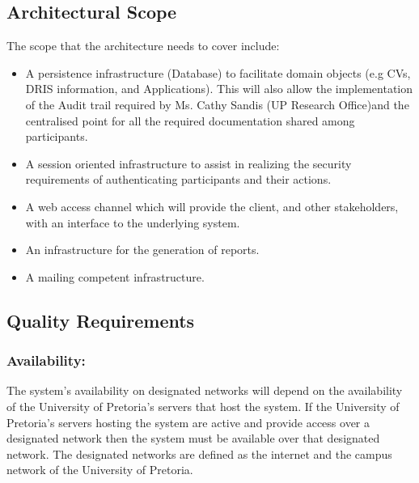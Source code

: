 \documentclass[12pt]{article}
\newcommand{\client}{Ms. Cathy Sandis (UP Research Office)}
\begin{document}
\subsection{Architectural Scope}
The scope that the architecture needs to cover include:
\begin{itemize}
\item A persistence infrastructure (Database) to facilitate domain objects (e.g CVs, DRIS information, and Applications). This will also allow the implementation of the Audit trail required by \client and the centralised point for all the required documentation shared among participants.
\item A session oriented infrastructure to assist in realizing the security requirements of authenticating participants and their actions.
\item A web access channel which will provide the client, and other stakeholders, with an interface to the underlying system.
\item An infrastructure for the generation of reports.
\item A mailing competent infrastructure.
\end{itemize}

\subsection{Quality Requirements} 
\vspace{0.2in}

\subsubsection{Availability:}

\begin{flushleft}

The system's availability on designated networks will depend on the availability of the University of Pretoria's servers that host the system. If the University of Pretoria's servers hosting the system are active and provide access over a designated network then the system must be available over that designated network. The designated networks are defined as the internet and the campus network of the University of Pretoria.

\end{flushleft}

\vspace{0.1in}
\end{document}

